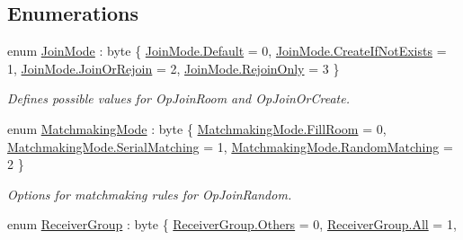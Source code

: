 \subsection*{Enumerations}
\begin{DoxyCompactItemize}
\item 
enum \hyperlink{namespace_exit_games_1_1_client_1_1_photon_ad2643c9be9b35f92b9ed739fb77bc657}{Join\+Mode} \+: byte \{ \hyperlink{namespace_exit_games_1_1_client_1_1_photon_ad2643c9be9b35f92b9ed739fb77bc657a7a1920d61156abc05a60135aefe8bc67}{Join\+Mode.\+Default} = 0, 
\hyperlink{namespace_exit_games_1_1_client_1_1_photon_ad2643c9be9b35f92b9ed739fb77bc657a1e41e14c1f9344f2db61fe8653b5b001}{Join\+Mode.\+Create\+If\+Not\+Exists} = 1, 
\hyperlink{namespace_exit_games_1_1_client_1_1_photon_ad2643c9be9b35f92b9ed739fb77bc657aa63ce0e3e810c781a410d3addc56db7f}{Join\+Mode.\+Join\+Or\+Rejoin} = 2, 
\hyperlink{namespace_exit_games_1_1_client_1_1_photon_ad2643c9be9b35f92b9ed739fb77bc657adc2168ee308fc14616dfd264d45cfd15}{Join\+Mode.\+Rejoin\+Only} = 3
 \}\begin{DoxyCompactList}\small\item\em Defines possible values for Op\+Join\+Room and Op\+Join\+Or\+Create. \end{DoxyCompactList}
\item 
enum \hyperlink{namespace_exit_games_1_1_client_1_1_photon_aa8150470595f719d6f62ff9467d97c7d}{Matchmaking\+Mode} \+: byte \{ \hyperlink{namespace_exit_games_1_1_client_1_1_photon_aa8150470595f719d6f62ff9467d97c7daa5912f7a88c36ab01e9c1c38fd7bad9e}{Matchmaking\+Mode.\+Fill\+Room} = 0, 
\hyperlink{namespace_exit_games_1_1_client_1_1_photon_aa8150470595f719d6f62ff9467d97c7da85e600e069b55d677fcc38fe96002751}{Matchmaking\+Mode.\+Serial\+Matching} = 1, 
\hyperlink{namespace_exit_games_1_1_client_1_1_photon_aa8150470595f719d6f62ff9467d97c7da43f0360f3d6dd072a905e7bf6343b565}{Matchmaking\+Mode.\+Random\+Matching} = 2
 \}\begin{DoxyCompactList}\small\item\em Options for matchmaking rules for Op\+Join\+Random. \end{DoxyCompactList}
\item 
enum \hyperlink{namespace_exit_games_1_1_client_1_1_photon_a73fefe1509e4ac1eb48e279422ec82bd}{Receiver\+Group} \+: byte \{ \hyperlink{namespace_exit_games_1_1_client_1_1_photon_a73fefe1509e4ac1eb48e279422ec82bda52ef9633d88a7480b3a938ff9eaa2a25}{Receiver\+Group.\+Others} = 0, 
\hyperlink{namespace_exit_games_1_1_client_1_1_photon_a73fefe1509e4ac1eb48e279422ec82bdab1c94ca2fbc3e78fc30069c8d0f01680}{Receiver\+Group.\+All} = 1, 

\end{DoxyCompactItemize}
